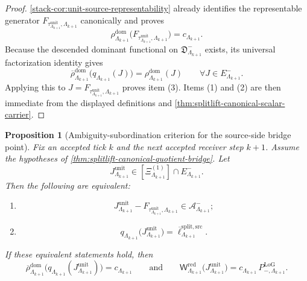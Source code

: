 \documentclass[11pt]{article}
\theoremstyle{definition}
\theoremstyle{plain}
\newtheorem{proposition}[definition]{Proposition}
\theoremstyle{remark}
\newcommand{\1}{\mathbf 1}
\begin{document}
\begin{proof}
\cref{stack-cor:unit-source-representability} already identifies the representable generator
\(
F_{\tau^{\mathrm{unit}}_{\Lambda_{k+1}},\Lambda_{k+1}}
\)
canonically and proves
\[
\rho^{\mathrm{dom}}_{\Lambda_{k+1}}
\!\bigl(
F_{\tau^{\mathrm{unit}}_{\Lambda_{k+1}},\Lambda_{k+1}}
\bigr)
=
c_{\Lambda_{k+1}}.
\]
Because the descended dominant functional on
\(
\mathfrak D^-_{\Lambda_{k+1}}
\)
exists, its universal factorization identity gives
\[
\overline{\rho}^{\mathrm{dom}}_{\Lambda_{k+1}}
\bigl(
q_{\Lambda_{k+1}}(J)
\bigr)
=
\rho^{\mathrm{dom}}_{\Lambda_{k+1}}(J)
\qquad
\forall J\in E^-_{\Lambda_{k+1}}.
\]
Applying this to
\(
J=
F_{\tau^{\mathrm{unit}}_{\Lambda_{k+1}},\Lambda_{k+1}}
\)
proves item \textnormal{(3)}.
Items \textnormal{(1)} and \textnormal{(2)} are then immediate from the displayed definitions and
\cref{thm:splitlift-canonical-scalar-carrier}.
\end{proof}

\begin{proposition}[Ambiguity-subordination criterion for the source-side bridge point]
\label{prop:splitlift-ambiguity-subordination}
Fix an accepted tick \(k\) and the next accepted receiver step \(k+1\).
Assume the hypotheses of \cref{thm:splitlift-canonical-quotient-bridge}.
Let
\[
J^{\mathrm{unit}}_{\Lambda_{k+1}}
\in
[\Xi^{(1)}_{\Lambda_{k+1}}]\cap E^-_{\Lambda_{k+1}}.
\]
Then the following are equivalent:
\begin{enumerate}[leftmargin=2em,label=(\alph*)]
\item
  \[
  J^{\mathrm{unit}}_{\Lambda_{k+1}}
  -
  F_{\tau^{\mathrm{unit}}_{\Lambda_{k+1}},\Lambda_{k+1}}
  \in
  \mathcal A^-_{\Lambda_{k+1}};
  \]
\item
  \[
  q_{\Lambda_{k+1}}
  \!\bigl(
  J^{\mathrm{unit}}_{\Lambda_{k+1}}
  \bigr)
  =
  \overline\ell^{\mathrm{split,src}}_{\Lambda_{k+1}}.
  \]
\end{enumerate}
If these equivalent statements hold, then
\[
\overline{\rho}^{\mathrm{dom}}_{\Lambda_{k+1}}
\!\bigl(
q_{\Lambda_{k+1}}(J^{\mathrm{unit}}_{\Lambda_{k+1}})
\bigr)
=
c_{\Lambda_{k+1}}
\qquad\text{and}\qquad
\mathsf W^{\mathrm{red}}_{\Lambda_{k+1}}
\!\bigl(
J^{\mathrm{unit}}_{\Lambda_{k+1}}
\bigr)
=
c_{\Lambda_{k+1}}\,
P^{\mathrm{LoG}}_{-,\Lambda_{k+1}}.
\]
\end{proposition}
\end{document}
